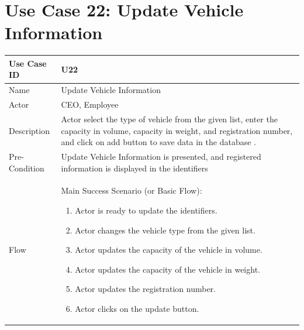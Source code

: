 \documentclass[12pt,a4paper]{report}
\begin{document}
\section{Use Case 22: Update Vehicle Information}
\begin{tabular}{ | m{3cm} | m{12cm}| } \hline
Use Case ID & U22   \\\hline
Name   &   Update Vehicle Information \\ \hline
Actor &  CEO, Employee  \\ \hline
Description & Actor select the type of vehicle from the given list, enter the capacity in volume, capacity in weight, and registration number, and click on add button to save data in the database .\\ \hline
Pre-Condition & Update Vehicle Information is presented, and registered information is displayed in the identifiers  \\\hline
Flow & Main Success Scenario (or Basic Flow):
\begin{enumerate}
\item Actor is ready to update the identifiers.
\item Actor changes the vehicle type from the given list.   
\item Actor updates the capacity of the vehicle in volume.
\item Actor updates the capacity of the vehicle in weight.
\item Actor updates the registration number. 
\item Actor clicks on the update button.
\end{enumerate}
\\\hline
\end{tabular}
\end{document}
